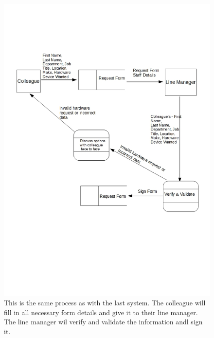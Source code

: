 \begin{figure}[H]
\includegraphics[width=\textwidth]{CurrentDFD.jpg}
\caption{This is the same process as with the last system. The colleague will fill in all necessary form details and give it to their line manager. The line manager wil verify and validate the information andl sign it.} \label{Page1Interview}
\end{figure}

